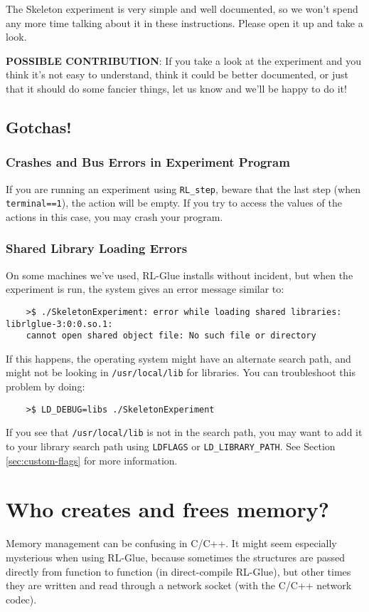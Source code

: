 \documentclass[11pt]{article}
\begin{document}
The Skeleton experiment is very simple and well documented, so we won't spend any more time talking about it in these instructions.
Please open it up and take a look.

\textbf{POSSIBLE CONTRIBUTION}: If you take a look at the experiment and you think it's not easy to understand, think it could be better documented, 
or just that it should do some fancier things, let us know and we'll be happy to do it!

\subsection{Gotchas!}
\subsubsection{Crashes and Bus Errors in Experiment Program}
If you are running an experiment using \texttt{RL\_step}, beware that the last step (when \texttt{terminal==1}), the action will be empty.  If you try to access the values of the actions in this 
case, you may crash your program.

\subsubsection{Shared Library Loading Errors}
\label{sec:gotchas-shared-libs}
On some machines we've used, RL-Glue installs without incident, but when the experiment is run, the system gives an error message similar to:
\begin{verbatim}
	>$ ./SkeletonExperiment: error while loading shared libraries: librlglue-3:0:0.so.1:
	cannot open shared object file: No such file or directory
\end{verbatim}

If this happens, the operating system might have an alternate search path, and might not be looking in \texttt{/usr/local/lib} for libraries. 
You can troubleshoot this problem by doing:
\begin{verbatim}
	>$ LD_DEBUG=libs ./SkeletonExperiment
\end{verbatim}
If you see that \texttt{/usr/local/lib} is not in the search path, you may want to add it to your library search path using \texttt{LDFLAGS} or \texttt{LD\_LIBRARY\_PATH}.  See Section \ref{sec:custom-flags} for more information.  




\section{Who creates and frees memory?}
Memory management can be confusing in C/C++.  It might seem especially mysterious when using RL-Glue, because sometimes the structures are passed directly 
from function to function (in direct-compile RL-Glue), but other times they are written and read through a network socket (with the C/C++ network codec).
\end{document}
